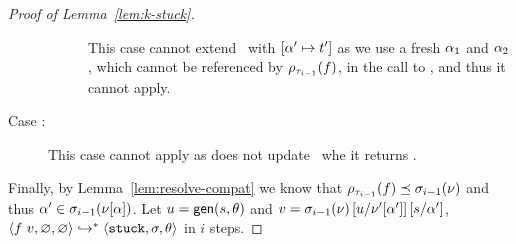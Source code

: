 \begin{proof}[Proof of Lemma~\ref{lem:k-stuck}]
\begin{description}
\begin{description}
        This case cannot extend \tsu\ with $[\thole' \mapsto t']$ as we
        use a fresh $\thole_1$ and $\thole_2$, which cannot be
        referenced by $\ptype{\trace_{i-1}}{f}$, in the call to
        \forcesym, and thus it cannot apply.
      \end{description}
    \item[Case \repcasebad:]
      This case cannot apply as \forcesym does not update \tsu\ whe
      it returns \stuck.
    \end{description}
  Finally, by Lemma~\ref{lem:resolve-compat} we know that
  $\vsub{\ptype{\trace_{i-1}}{f}}{\resolve{\ehole}{\vsu_{i-1}}}$
  and thus $\thole' \in \resolve{\vhole{\thole}}{\vsu_{i-1}}$.
  Let $u = \gen{s}{\tsu}$
  and $v = \resolve{\ehole}{\vsu_{i-1}}\sub{\ehole'[\thole']}{u}\sub{\thole'}{s}$,
  $\steps{\eapp{f}{v}}{\emptysu}{\emptysu}{\stuck}{\vsu}{\tsu}$ in $i$ steps.




\end{proof}
